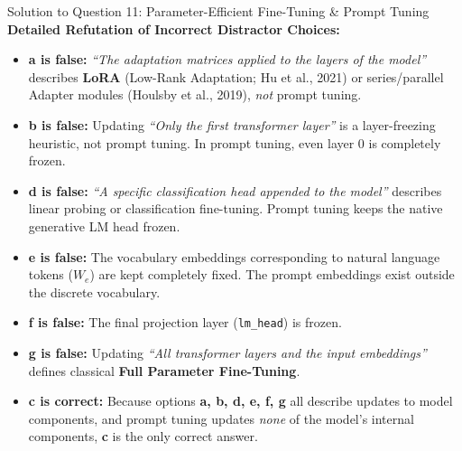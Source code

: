 \documentclass[11pt,a4paper]{article}
\begin{document}
\begin{solutionbox}{Solution to Question 11: Parameter-Efficient Fine-Tuning \& Prompt Tuning}
\medskip
\noindent
\textbf{Detailed Refutation of Incorrect Distractor Choices:}
\begin{itemize}[leftmargin=1.5em]
    \item \textbf{a is false:} \textit{``The adaptation matrices applied to the layers of the model''} describes \textbf{LoRA} (Low-Rank Adaptation; Hu et al., 2021) or series/parallel Adapter modules (Houlsby et al., 2019), \emph{not} prompt tuning.
    \item \textbf{b is false:} Updating \textit{``Only the first transformer layer''} is a layer-freezing heuristic, not prompt tuning. In prompt tuning, even layer 0 is completely frozen.
    \item \textbf{d is false:} \textit{``A specific classification head appended to the model''} describes linear probing or classification fine-tuning. Prompt tuning keeps the native generative LM head frozen.
    \item \textbf{e is false:} The vocabulary embeddings corresponding to natural language tokens ($W_e$) are kept completely fixed. The prompt embeddings exist outside the discrete vocabulary.
    \item \textbf{f is false:} The final projection layer (\texttt{lm\_head}) is frozen.
    \item \textbf{g is false:} Updating \textit{``All transformer layers and the input embeddings''} defines classical \textbf{Full Parameter Fine-Tuning}.
    \item \textbf{c is correct:} Because options \textbf{a, b, d, e, f, g} all describe updates to model components, and prompt tuning updates \emph{none} of the model's internal components, \textbf{c} is the only correct answer.
\end{itemize}
\end{solutionbox}
\end{document}
